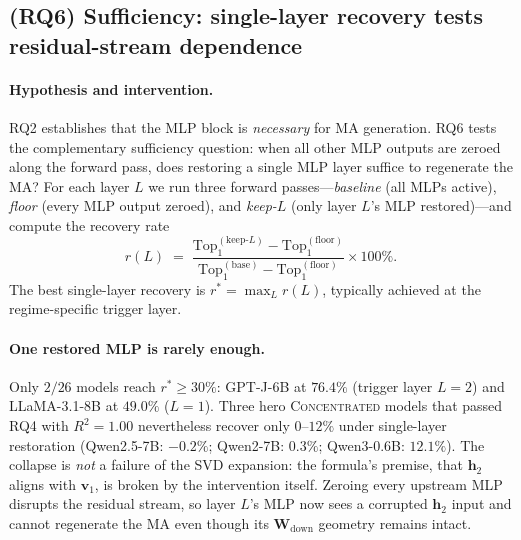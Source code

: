 \documentclass{article}
\newcommand{\Wdown}{\mathbf{W}_{\text{down}}}
\newcommand{\topk}{\mathrm{Top}}
\begin{document}
\subsection{(RQ6) Sufficiency: single-layer recovery tests residual-stream dependence}
\label{sec:rq6}

\paragraph{Hypothesis and intervention.}
RQ2 establishes that the MLP block is \emph{necessary} for MA
generation. RQ6 tests the complementary sufficiency question: when
all other MLP outputs are zeroed along the forward pass, does
restoring a single MLP layer suffice to regenerate the MA? For each
layer $L$ we run three forward passes---\emph{baseline} (all MLPs
active), \emph{floor} (every MLP output zeroed), and
\emph{keep-$L$} (only layer $L$'s MLP restored)---and compute the
recovery rate
\begin{equation}
  \label{eq:recovery}
  r(L) \;=\; \frac{\topk_1^{(\text{keep-}L)} - \topk_1^{(\text{floor})}}
                  {\topk_1^{(\text{base})} - \topk_1^{(\text{floor})}} \times 100\%.
\end{equation}
The best single-layer recovery is $r^{*} = \max_{L} r(L)$, typically
achieved at the regime-specific trigger layer.

\paragraph{One restored MLP is rarely enough.}
Only $2/26$ models reach $r^{*} \geq 30\%$: GPT-J-6B at $76.4\%$
(trigger layer $L{=}2$) and LLaMA-3.1-8B at $49.0\%$ ($L{=}1$). Three
hero \textsc{Concentrated} models that passed RQ4 with $R^{2}=1.00$
nevertheless recover only $0$--$12\%$ under single-layer restoration
(Qwen2.5-7B: $-0.2\%$; Qwen2-7B: $0.3\%$; Qwen3-0.6B: $12.1\%$). The
collapse is \emph{not} a failure of the SVD expansion: the
formula's premise, that $\mathbf{h}_2$ aligns with $\mathbf{v}_1$, is
broken by the intervention itself. Zeroing every upstream MLP disrupts
the residual stream, so layer $L$'s MLP now sees a corrupted
$\mathbf{h}_2$ input and cannot regenerate the MA even though its
$\Wdown$ geometry remains intact.
\end{document}
